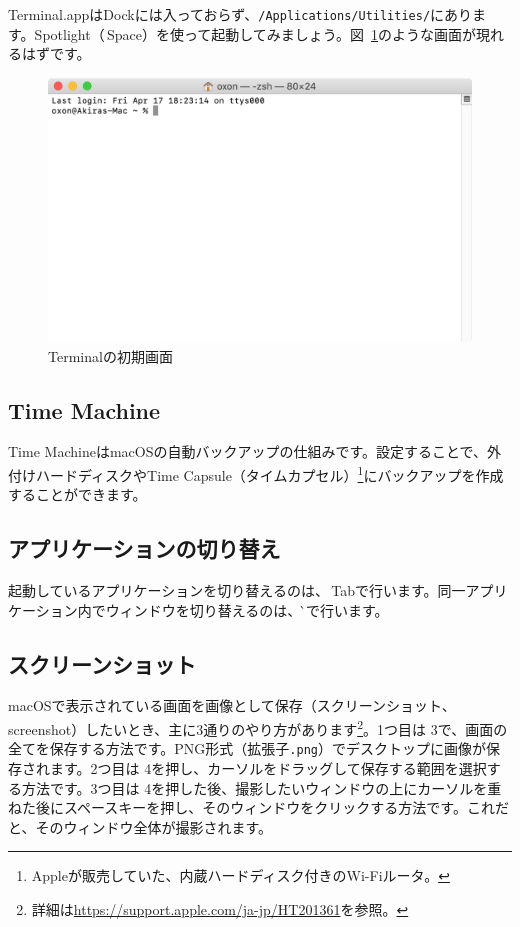 Terminal.appはDockには入っておらず、\texttt{/Applications/Utilities/}にあります。Spotlight（\cmdkey\,Space）を使って起動してみましょう。図~\ref{fig:Terminal}のような画面が現れるはずです。
\begin{figure}
  \centering
  \includegraphics[scale=0.35]{fig/Terminal.png}
  \caption{Terminalの初期画面}
  \label{fig:Terminal}
\end{figure}

\subsection{Time Machine}
Time MachineはmacOSの自動バックアップの仕組みです。設定することで、外付けハードディスクやTime Capsule（タイムカプセル）\footnote{Appleが販売していた、内蔵ハードディスク付きのWi-Fiルータ。}にバックアップを作成することができます。

\subsection{アプリケーションの切り替え}
起動しているアプリケーションを切り替えるのは、\cmdkey\,Tabで行います。同一アプリケーション内でウィンドウを切り替えるのは、\cmdkey\,\`\,で行います。

\subsection{スクリーンショット}
macOSで表示されている画面を画像として保存（スクリーンショット、screenshot）したいとき、主に3通りのやり方があります\footnote{詳細は\url{https://support.apple.com/ja-jp/HT201361}を参照。}。1つ目は\cmdkey\,\shiftkey\,3で、画面の全てを保存する方法です。PNG形式（拡張子\texttt{.png}）でデスクトップに画像が保存されます。2つ目は\cmdkey\,\shiftkey\,4を押し、カーソルをドラッグして保存する範囲を選択する方法です。3つ目は\cmdkey\,\shiftkey\,4を押した後、撮影したいウィンドウの上にカーソルを重ねた後にスペースキーを押し、そのウィンドウをクリックする方法です。これだと、そのウィンドウ全体が撮影されます。


